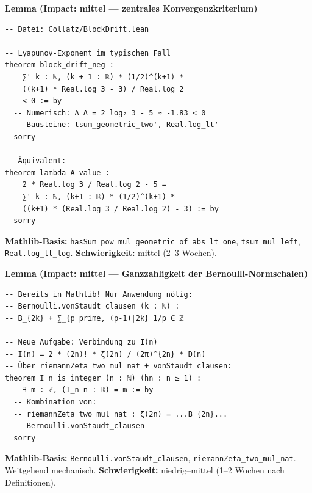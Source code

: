 \documentclass[12pt,a4paper]{article}
\begin{document}
\begin{tcolorbox}[roadmap, title={Priorität 3: Block-Drift und negative Kontraktion}]
\textbf{Lemma (Impact: mittel --- zentrales Konvergenzkriterium)}
\begin{lstlisting}[language=Lean4]
-- Datei: Collatz/BlockDrift.lean

-- Lyapunov-Exponent im typischen Fall
theorem block_drift_neg :
    ∑' k : ℕ, (k + 1 : ℝ) * (1/2)^(k+1) *
    ((k+1) * Real.log 3 - 3) / Real.log 2
    < 0 := by
  -- Numerisch: Λ_A = 2 log₂ 3 - 5 ≈ -1.83 < 0
  -- Bausteine: tsum_geometric_two', Real.log_lt'
  sorry

-- Äquivalent:
theorem lambda_A_value :
    2 * Real.log 3 / Real.log 2 - 5 =
    ∑' k : ℕ, (k+1 : ℝ) * (1/2)^(k+1) *
    ((k+1) * (Real.log 3 / Real.log 2) - 3) := by
  sorry
\end{lstlisting}
\textbf{Mathlib-Basis:} \texttt{hasSum\_pow\_mul\_geometric\_of\_abs\_lt\_one},
\texttt{tsum\_mul\_left}, \texttt{Real.log\_lt\_log}.
\textbf{Schwierigkeit:} mittel (2--3 Wochen).
\end{tcolorbox}

\begin{tcolorbox}[roadmap, title={Priorität 4: von-Staudt-Clausen für $\mathcal{I}(n)$}]
\textbf{Lemma (Impact: mittel --- Ganzzahligkeit der Bernoulli-Normschalen)}
\begin{lstlisting}[language=Lean4]
-- Bereits in Mathlib! Nur Anwendung nötig:
-- Bernoulli.vonStaudt_clausen (k : ℕ) :
-- B_{2k} + ∑_{p prime, (p-1)∣2k} 1/p ∈ ℤ

-- Neue Aufgabe: Verbindung zu I(n)
-- I(n) = 2 * (2n)! * ζ(2n) / (2π)^{2n} * D(n)
-- Über riemannZeta_two_mul_nat + vonStaudt_clausen:
theorem I_n_is_integer (n : ℕ) (hn : n ≥ 1) :
    ∃ m : ℤ, (I_n n : ℝ) = m := by
  -- Kombination von:
  -- riemannZeta_two_mul_nat : ζ(2n) = ...B_{2n}...
  -- Bernoulli.vonStaudt_clausen
  sorry
\end{lstlisting}
\textbf{Mathlib-Basis:} \texttt{Bernoulli.vonStaudt\_clausen},
\texttt{riemannZeta\_two\_mul\_nat}. Weitgehend mechanisch.
\textbf{Schwierigkeit:} niedrig--mittel (1--2 Wochen nach Definitionen).
\end{tcolorbox}
\end{document}

